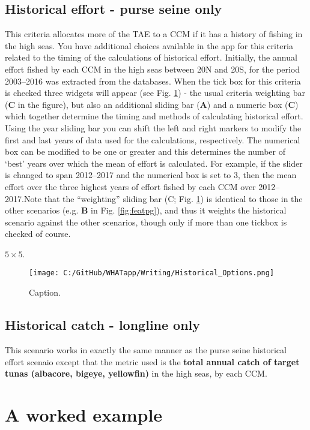 \documentclass[11pt]{article}
\begin{document}
\subsection*{Historical effort - purse seine only}
This criteria allocates more of the TAE to a CCM if it has a history of fishing in the high seas. You have additional choices available in the app for this criteria related to the timing of the calculations of historical effort. Initially, the annual effort fished by each CCM in the high seas between 20\degree N and 20\degree S, for the period 2003--2016 was extracted from the databases. When the tick box for this criteria is checked three widgets will appear (see Fig. \ref{fig:HistOp}) - the usual criteria weighting bar ({\bf C} in the figure), but also an additional sliding bar ({\bf A}) and a numeric box ({\bf C}) which together determine the timing and methods of calculating historical effort. Using the year sliding bar you can shift the left and right markers to modify the first and last years of data used for the calculations, respectively. The numerical box can be modified to be one or greater and this determines the number of `best' years over which the mean of effort is calculated. For example, if the slider is changed to span 2012--2017 and the numerical box is set to 3, then the mean effort over the three highest years of effort fished by each CCM over 2012--2017.Note that the ``weighting'' sliding bar ({C}; Fig. \ref{fig:HistOp}) is identical to those in the other scenarios (e.g. {\bf B} in Fig. \ref{fig:featpg}), and thus it weights the historical scenario against the other scenarios, though only if more than one tickbox is checked of course.

$5\times5$\degree .


\newpage
 \begin{figure} [h]
  \centering
\texttt{[image: C:/GitHub/WHATapp/Writing/Historical\_Options.png]}
  \caption {Caption.}
  \label{fig:HistOp}
\end{figure}

\subsection*{Historical catch - longline only}
This scenario works in exactly the same manner as the purse seine historical effort scenaio except that the metric used is the {\bf total annual catch of target tunas (albacore, bigeye, yellowfin)} in the high seas, by each CCM.

\section{A worked example}
\end{document}
